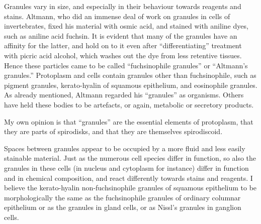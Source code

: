 \documentclass[a4paper, 12pt, oneside]{article}
\begin{document}
Granules vary in size, and especially in their behaviour towards reagents and stains. Altmann, who did an immense deal of work on granules in cells of invertebrates, fixed his material with osmic acid, and stained with aniline dyes, such as aniline acid fuchsin. It is evident that many of the granules have an affinity for the latter, and hold on to it even after ``differentiating'' treatment with picric acid alcohol, which washes out the dye from less retentive tissues. Hence these particles came to be called ``fuchsinophile granules'' or ``Altmann's granules.'' Protoplasm and cells contain granules other than fuchsinophile, such as pigment granules, kerato-hyalin of squamous epithelium, and eosinophile granules. As already mentioned, Altmann regarded his ``granules'' as organisms. Others have held these bodies to be artefacts, or again, metabolic or secretory products.

My own opinion is that ``granules'' are the essential elements of protoplasm, that they are parts of spirodisks, and that they are themselves spirodiscoid.

Spaces between granules appear to be occupied by a more fluid and less easily stainable material. Just as the numerous cell species differ in function, so also the granules in these cells (in nucleus and cytoplasm for instance) differ in function and in chemical composition, and react differently towards stains and reagents. I believe the kerato-hyalin non-fuchsinophile granules of squamous epithelium to be morphologically the same as the fuchsinophile granules of ordinary columnar epithelium or as the granules in gland cells, or as Nissl's granules in ganglion cells.
\end{document}
